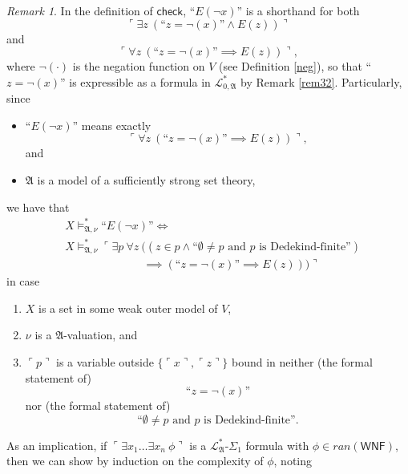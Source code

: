 \documentclass[12pt, twoside]{memoir}
\numberwithin{equation}{section}
\theoremstyle{definition}
\theoremstyle{remark}
\newtheorem{rem}[thm]{Remark}
\theoremstyle{definition}
\theoremstyle{definition}
\theoremstyle{definition}
\theoremstyle{remark}
\begin{document}
\begin{rem}\label{shcs}
In the definition of $\mathsf{check}$, $\text{``} E(\neg x) \text{''}$ is a shorthand for both $$\ulcorner \exists z \ (\text{``} z = \neg (x) \text{''} \wedge E(z)) \urcorner$$ and $$\ulcorner \forall z \ (\text{``} z = \neg (x) \text{''} \implies E(z)) \urcorner,$$ where $\neg (\cdot)$ is the negation function on $V$ (see Definition \ref{neg}), so that ``$z = \neg (x)$'' is expressible as a formula in $\mathcal{L}^{*}_{0, \mathfrak{A}}$ by Remark \ref{rem32}. Particularly, since 
\begin{itemize}
    \item $\text{``} E(\neg x) \text{''}$ means exactly $$\ulcorner \forall z \ (\text{``} z = \neg (x) \text{''} \implies E(z)) \urcorner,$$ and
    \item $\mathfrak{A}$ is a model of a sufficiently strong set theory,
\end{itemize} 
we have that
\begin{align*}
    & X \models^*_{\mathfrak{A}, \nu} \text{``} E(\neg x) \text{''} \iff \\
    & X \models^*_{\mathfrak{A}, \nu} \ulcorner \exists p \ \forall z \ ((z \in p \wedge \text{``}\emptyset \neq p \text{ and } p \text{ is Dedekind-finite''}) \\
    & \mspace{125mu} \implies (\text{``} z = \neg (x) \text{''} \implies E(z))) \urcorner
\end{align*}
in case 
\begin{enumerate}[label=(\alph*)]
    \item $X$ is a set in some weak outer model of $V$,
    \item $\nu$ is a $\mathfrak{A}$-valuation, and
    \item $\ulcorner p \urcorner$ is a variable outside $\{\ulcorner x \urcorner, \ulcorner z \urcorner\}$ bound in neither (the formal statement of)
    \begin{equation*}
        \text{``} z = \neg (x) \text{''}
    \end{equation*}
    nor (the formal statement of)
    \begin{equation*}
        \text{``}\emptyset \neq p \text{ and } p \text{ is Dedekind-finite''.}
    \end{equation*}
\end{enumerate} 
As an implication, if $\ulcorner \exists x_1 \dots \exists x_n \ \phi \urcorner$ is a $\mathcal{L}^{*}_{\mathfrak{A}}$-$\Sigma_1$ formula with $\phi \in ran(\mathsf{WNF})$, then we can show by induction on the complexity of $\phi$, noting

\end{rem}
\end{document}

